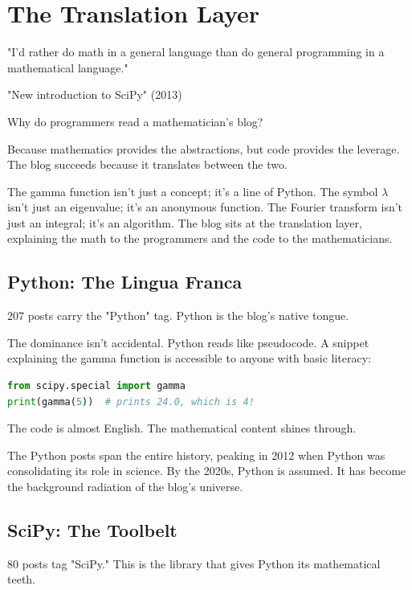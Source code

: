 \chapter{The Translation Layer}

\epigraph{"I'd rather do math in a general language than do general programming in a mathematical language."}{"New introduction to SciPy" (2013)}

\bigskip

Why do programmers read a mathematician's blog?

Because mathematics provides the abstractions, but code provides the leverage. The blog succeeds because it translates between the two.

The gamma function isn't just a concept; it's a line of Python. The symbol $\lambda$ isn't just an eigenvalue; it's an anonymous function. The Fourier transform isn't just an integral; it's an algorithm. The blog sits at the translation layer, explaining the math to the programmers and the code to the mathematicians.

\bigskip

\section*{Python: The Lingua Franca}

207 posts carry the "Python" tag. Python is the blog's native tongue.

The dominance isn't accidental. Python reads like pseudocode. A snippet explaining the gamma function is accessible to anyone with basic literacy:

\begin{lstlisting}[language=python]
from scipy.special import gamma
print(gamma(5))  # prints 24.0, which is 4!
\end{lstlisting}

The code is almost English. The mathematical content shines through.

The Python posts span the entire history, peaking in 2012 when Python was consolidating its role in science. By the 2020s, Python is assumed. It has become the background radiation of the blog's universe.

\bigskip

\section*{SciPy: The Toolbelt}

80 posts tag "SciPy." This is the library that gives Python its mathematical teeth.

